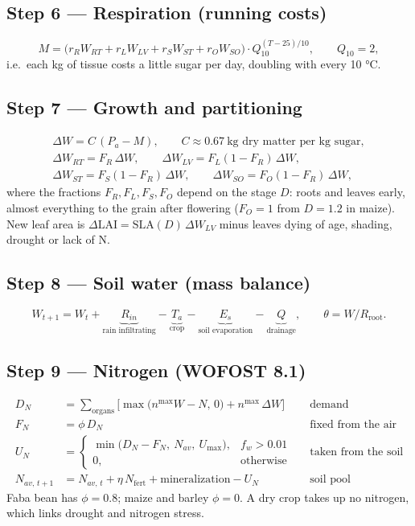 \documentclass[11pt,a4paper]{article}
\begin{document}
\subsection*{Step 6 --- Respiration (running costs)}
\begin{equation}
  M = \big(r_R W_{RT} + r_L W_{LV} + r_S W_{ST} + r_O W_{SO}\big)\cdot Q_{10}^{(T-25)/10},\qquad Q_{10} = 2,
\end{equation}
i.e.\ each kg of tissue costs a little sugar per day, doubling with every 10 °C.

\subsection*{Step 7 --- Growth and partitioning}
\begin{gather}
  \Delta W = C\,(P_a - M),\qquad C \approx 0.67\ \text{kg dry matter per kg sugar},\\
  \Delta W_{RT} = F_R\,\Delta W,\qquad
  \Delta W_{LV} = F_L(1-F_R)\,\Delta W,\\
  \Delta W_{ST} = F_S(1-F_R)\,\Delta W,\qquad
  \Delta W_{SO} = F_O(1-F_R)\,\Delta W,
\end{gather}
where the fractions \(F_R, F_L, F_S, F_O\) depend on the stage \(D\): roots and leaves early, almost everything to the
grain after flowering (\(F_O = 1\) from \(D = 1.2\) in maize). New leaf area is
\(\Delta\mathrm{LAI} = \mathrm{SLA}(D)\,\Delta W_{LV}\) minus leaves dying of age, shading, drought or lack of N.

\subsection*{Step 8 --- Soil water (mass balance)}
\begin{equation}
  W_{t+1} = W_t + \underbrace{R_{in}}_{\text{rain infiltrating}} - \underbrace{T_a}_{\text{crop}}
  - \underbrace{E_s}_{\text{soil evaporation}} - \underbrace{Q}_{\text{drainage}},
  \qquad \theta = W / R_{\mathrm{root}}.
\end{equation}

\subsection*{Step 9 --- Nitrogen (WOFOST 8.1)}
\begin{align}
  D_N &= \sum_{\text{organs}}\Big[\max\big(n^{\max} W - N,\,0\big) + n^{\max}\,\Delta W\Big] && \text{demand}\\
  F_N &= \phi\,D_N && \text{fixed from the air}\\
  U_N &= \begin{cases}\min\big(D_N - F_N,\ N_{av},\ U_{\max}\big), & f_w > 0.01\\ 0, & \text{otherwise}\end{cases} && \text{taken from the soil}\\
  N_{av,\,t+1} &= N_{av,\,t} + \eta\,N_{\mathrm{fert}} + \text{mineralization} - U_N && \text{soil pool}
\end{align}
Faba bean has \(\phi = 0.8\); maize and barley \(\phi = 0\). A dry crop takes up no nitrogen, which links drought and
nitrogen stress.
\end{document}
